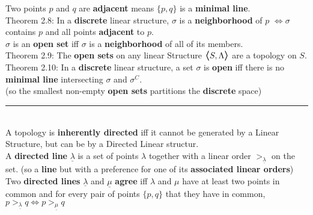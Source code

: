 \documentclass{article}
\newcommand{\hcm}[1][1]{\hspace{#1 cm}}
\newcommand{\bra}[1][1.2]{\scalebox{#1}{$\boldsymbol{\langle}$}}
\newcommand{\nl}[1][12]{\\[#1pt]}
\newcommand{\ket}[1][1.2]{\scalebox{#1}{$\boldsymbol{\rangle}$}}
\newcommand {\chb}[1]{\textbf{#1}}
\begin{document}
\begin{flushleft}
Two points $p$ and $q$ are \chb{adjacent} means $\{p, q\}$ is a \chb{minimal line}.\nl

\hcm Theorem 2.8: In a \chb{discrete} linear structure, $\sigma$ is a \chb{neighborhood} of $p$ $\iff \sigma$ contains $p$ and all points \chb{adjacent} to $p$.\nl

$\sigma$ is an \chb{open set} iff $\sigma$ is a \chb{neighborhood} of all of its members.\nl

\hcm Theorem 2.9: The \chb{open sets} on any linear Structure  $\bra S, \Lambda\ket$ are a topology on $S$.\nl

\hcm Theorem 2.10: In a \chb{discrete} linear structure, a set $\sigma$ is \chb{open} iff there is no \chb{minimal line} intersecting $\sigma$ and $\sigma^C$.\nl[3]
\hcm (so the smallest non-empty \chb{open sets} partitions the \chb{discrete} space)\nl[10]

\par\noindent\rule{\textwidth}{0.4pt}\nl[5] %

A topology is \chb{inherently directed} iff it cannot be generated by a Linear Structure, but can be by a Directed Linear structur.\nl[10]

A \chb{directed line} $\underline{\lambda}$ is a set of points $\lambda$ together with a linear order $>_{\underline{\lambda}}$ on the set. (so a \chb{line} but with a preference for one of its \chb{associated linear orders})\nl[10]

Two \chb{directed lines} $\underline{\lambda}$ and $\underline{\mu}$ \chb{agree} iff $\lambda$ and $\mu$ have at least two points in common and for every pair of points $\{p,q\}$ that they have in common, $p >_{\underline{\lambda}}q \iff p >_{\underline{\mu}}q$ 






\end{flushleft}
\end{document}
